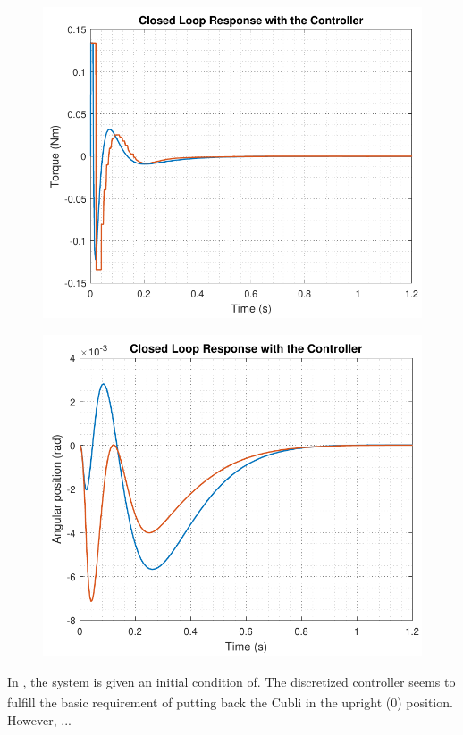   \begin{minipage}{0.45\linewidth}
    \begin{figure}[H]
      \includegraphics[scale=.53]{figures/torqueComp.pdf}
      \captionsetup{justification=centering}
      \label{fig:discreteVsContinuousOutputController}
    \end{figure}\vspace{-5mm}
  \end{minipage}
  \hspace{0.03\linewidth}
  \begin{minipage}{0.45\linewidth}
    \begin{figure}[H]\vspace{-9mm}
      \includegraphics[scale=.53]{figures/positionComp.pdf}
      \captionsetup{justification=centering}
      \label{fig:discreteVsContinuousSimulation}
    \end{figure}\vspace{-5mm}
  \end{minipage}


In , the system is given an initial condition of. The discretized controller seems to fulfill the basic requirement of putting back the Cubli in the upright (\si{0^{\circ}}) position. However, ...